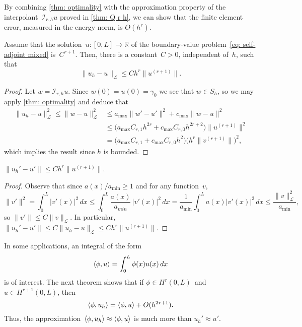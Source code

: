 By combining \cref{thm: optimality} with the approximation property of the 
interpolant~$\mathcal{I}_{r,h}u$ proved in \cref{thm: Q r h}, we can show
that the finite element error, measured in the energy norm, is $O(h^r)$.

\begin{theorem}\label{thm: uh-u L}
Assume that the solution~$u:[0,L]\to\mathbb{R}$ of the boundary-value 
problem~\eqref{eq: self-adjoint mixed} is~$C^{r+1}$.  Then,
there is a constant~$C>0$, independent of~$h$, such that
\[
\|u_h-u\|_{\mathcal{L}}\le Ch^r\|u^{(r+1)}\|.
\]
\end{theorem}
\begin{proof}
Let $w=\mathcal{I}_{r,h}u$.  Since $w(0)=u(0)=\gamma_0$ we see that $w\in S_h$,
so we may apply \cref{thm: optimality} and deduce that
\begin{align*}
\|u_h-u\|_{\mathcal{L}}^2\le\|w-u\|_{\mathcal{L}}^2
	&\le a_{\max}\|w'-u'\|^2+c_{\max}\|w-u\|^2\\
	&\le\bigl(a_{\max}C_{r,1}h^{2r}+c_{\max}C_{r,0}h^{2r+2}\bigr)
	\|u^{(r+1)}\|^2\\
	&=\bigl(a_{\max}C_{r,1}+c_{\max}C_{r,0}h^2\bigr)
	\bigl(h^r\|v^{(r+1)}\|\bigr)^2,
\end{align*}
which implies the result since $h$ is bounded.
\end{proof}
\begin{corollary}
$\|u_h'-u'\|\le Ch^r\|u^{(r+1)}\|$.
\end{corollary}
\begin{proof}
Observe that since $a(x)/a_{\min}\ge1$ and for any function~$v$,
\[
\|v'\|^2=\int_0^L|v'(x)|^2\,dx\le\int_0^L\frac{a(x)}{a_{min}}\,|v'(x)|^2\,dx
	=\frac{1}{a_{\min}}\int_0^La(x)|v'(x)|^2\,dx
	\le\frac{\|v\|_{\mathcal{L}}^2}{a_{\min}},
\]
so $\|v'\|\le C\|v\|_{\mathcal{L}}$.
In particular, $\|u_h'-u'\|\le C\|u_h-u\|_{\mathcal{L}}\le Ch^r\|u^{(r+1)}\|$.
\end{proof}

In some applications, an integral of the form
\[
\langle\phi,u\rangle=\int_0^L\phi(x)u(x)\,dx
\]
is of interest.  The next theorem shows that if $\phi\in H^r(0,L)$~and 
$u\in H^{r+1}(0,L)$, then
\[
\langle\phi,u_h\rangle=\langle\phi,u\rangle+O(h^{2r+1}).
\]
Thus, the approximation~$\langle\phi,u_h\rangle\approx\langle\phi,u\rangle$ is much more
than $u_h'\approx u'$.

